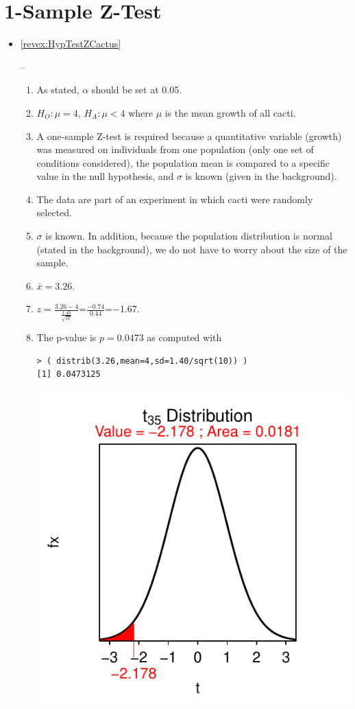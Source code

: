 \documentclass[10pt,openany]{book}\usepackage[]{graphicx}\usepackage[]{color}
\makeatletter
\newenvironment{kframe}{%
 \def\at@end@of@kframe{}%
 \ifinner\ifhmode%
  \def\at@end@of@kframe{\end{minipage}}%
  \begin{minipage}{\columnwidth}%
 \fi\fi%
 \def\FrameCommand##1{\hskip\@totalleftmargin \hskip-\fboxsep
 \colorbox{shadecolor}{##1}\hskip-\fboxsep
     \hskip-\linewidth \hskip-\@totalleftmargin \hskip\columnwidth}%
 \MakeFramed {\advance\hsize-\width
   \@totalleftmargin\z@ \linewidth\hsize
   \@setminipage}}%
 {\par\unskip\endMakeFramed%
 \at@end@of@kframe}
\newenvironment{knitrout}{}{} %
\makeatother
\begin{document}
\section*{1-Sample Z-Test}
\begin{itemize}
  \item \hypertarget{ans:HypTestZCactus}{\ref{revex:HypTestZCactus}} --
    \begin{enumerate}
      \item As stated, $\alpha$ should be set at 0.05.
      \item $H_{O}:\mu=4$, $H_{A}:\mu<4$ where $\mu$ is the mean growth of all cacti.
      \item A one-sample Z-test is required because a quantitative variable (growth) was measured on individuals from one population (only one set of conditions considered), the population mean is compared to a specific value in the null hypothesis, and $\sigma$ is known (given in the background).
      \item The data are part of an experiment in which cacti were randomly selected.
      \item $\sigma$ is known.  In addition, because the population distribution is normal (stated in the background), we do not have to worry about the size of the sample.
      \item $\bar{x}=3.26$.
      \item $z=\frac{3.26-4}{\frac{1.40}{\sqrt{10}}}$=$\frac{-0.74}{0.44}$=$-1.67$.
      \item The p-value is $p=0.0473$ as computed with
\begin{knitrout}
\color{fgcolor}\begin{kframe}
\begin{verbatim}
> ( distrib(3.26,mean=4,sd=1.40/sqrt(10)) )
[1] 0.0473125
\end{verbatim}
\end{kframe}

{\centering \includegraphics[width=.4\linewidth]{Figs/unnamed-chunk-354-1} 

}
\end{knitrout}
\end{enumerate}
\end{itemize}
\end{document}
